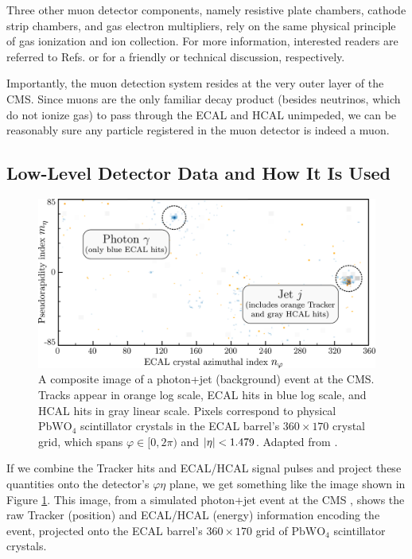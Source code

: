 \documentclass[11pt, a4paper]{article}
\newcommand{\chem}[1]{\ensuremath{\mathrm{#1}}}  %
\begin{document}
Three other muon detector components, namely resistive plate chambers, cathode strip chambers, and gas electron multipliers, rely on the same physical principle of gas ionization and ion collection. For more information, interested readers are referred to Refs. \cite{muon-web} or \cite{muon-tdr} for a friendly or technical discussion, respectively.

Importantly, the muon detection system resides at the very outer layer of the CMS. Since muons are the only familiar decay product (besides neutrinos, which do not ionize gas) to pass through the ECAL and HCAL unimpeded, we can be reasonably sure any particle registered in the muon detector is indeed a muon.

\subsection{Low-Level Detector Data and How It Is Used} \label{ss:three-methods}

\begin{figure}[htb!]
    \centering
    \includegraphics[width=\linewidth]{raster/raster-svg/event-image.pdf}
    \caption{A composite image of a photon+jet (background) event at the CMS. Tracks appear in orange log scale, ECAL hits in blue log scale, and HCAL hits in gray linear scale. Pixels correspond to physical \chem{PbWO_4} scintillator crystals in the ECAL barrel's $ 360 \times 170 $ crystal grid, which spans $ \varphi \in [0, 2\pi) $ and $ \abs{\eta} < 1.479$. Adapted from \cite{andrews-higgs}.}
    \label{fig:data-raw-ecal}
\end{figure}

If we combine the Tracker hits and ECAL/HCAL signal pulses and project these quantities onto the detector's $ \varphi \eta $ plane, we get something like the image shown in Figure \ref{fig:data-raw-ecal}. This image, from a simulated photon+jet event at the CMS \cite{data-bg-jet}, shows the raw Tracker (position) and ECAL/HCAL (energy) information encoding the event, projected onto the ECAL barrel's $ 360 \times 170 $ grid of \chem{PbWO_4} scintillator crystals. 
\end{document}
